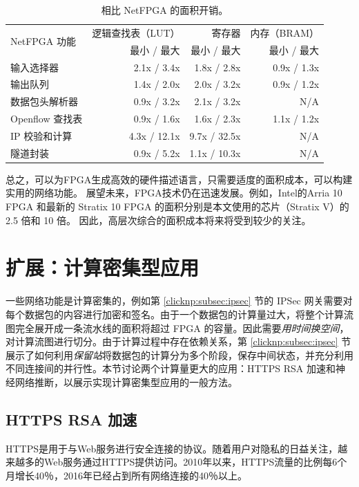 \begin{table}[htbp]
	\centering
	\caption{相比 NetFPGA 的面积开销。}
	\label{clicknp:tab:netfpga}
	\small
		\begin{tabular}{l|r|r|r}
			\toprule
			\multirow{2}{2.2cm}{NetFPGA 功能} & 逻辑查找表（LUT） & 寄存器 & 内存（BRAM） \\
			& 最小 / 最大 & 最小 / 最大 & 最小 / 最大 \\
			\midrule
			输入选择器  & 2.1x / 3.4x & 1.8x / 2.8x & 0.9x / 1.3x \\
			输出队列   & 1.4x / 2.0x & 2.0x / 3.2x & 0.9x / 1.2x \\
			数据包头解析器  & 0.9x / 3.2x & 2.1x / 3.2x & N/A \\
			Openflow 查找表 & 0.9x / 1.6x & 1.6x / 2.3x & 1.1x / 1.2x \\
			\midrule
			\midrule
			IP 校验和计算    & 4.3x / 12.1x & 9.7x / 32.5x & N/A \\
			隧道封装          & 0.9x / 5.2x & 1.1x / 10.3x & N/A \\
			\bottomrule
		\end{tabular}
\end{table}

总之，\name 可以为FPGA生成高效的硬件描述语言，只需要适度的面积成本，可以构建实用的网络功能。
展望未来，FPGA技术仍在迅速发展。例如，Intel的Arria 10 FPGA 和最新的 Stratix 10 FPGA 的面积分别是本文使用的芯片（Stratix V）的 2.5 倍和 10 倍。
因此，高层次综合的面积成本将来将受到较少的关注。

\section{扩展：计算密集型应用}

一些网络功能是计算密集的，例如第 \ref{clicknp:subsec:ipsec} 节的 IPSec 网关需要对每个数据包的内容进行加密和签名。由于一个数据包的计算量过大，将整个计算流图完全展开成一条流水线的面积将超过 FPGA 的容量。因此需要\emph{用时间换空间}，对计算流图进行切分。由于计算过程中存在依赖关系，第 \ref{clicknp:subsec:ipsec} 节展示了如何利用\emph{保留站}将数据包的计算分为多个阶段，保存中间状态，并充分利用不同连接间的并行性。本节讨论两个计算量更大的应用：HTTPS RSA 加速和神经网络推断，以展示实现计算密集型应用的一般方法。

\subsection{HTTPS RSA 加速}


HTTPS是用于与Web服务进行安全连接的协议。随着用户对隐私的日益关注，越来越多的Web服务通过HTTPS提供访问。2010年以来，HTTPS流量的比例每6个月增长40％，2016年已经占到所有网络连接的40％以上。

